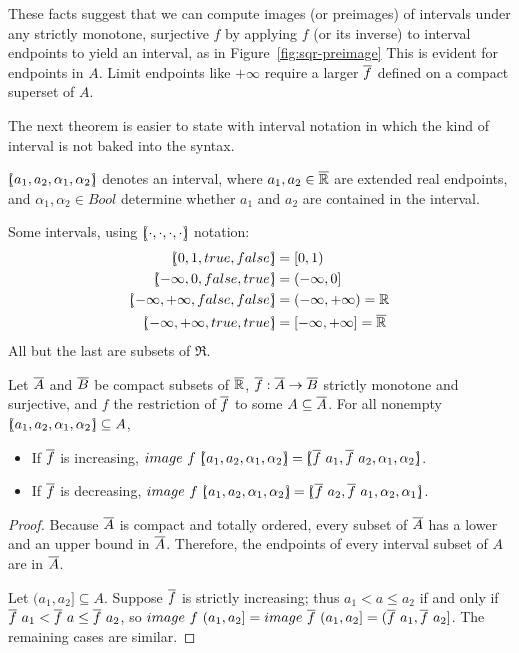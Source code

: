 These facts suggest that we can compute images (or preimages) of intervals under any strictly monotone, surjective $f$ by applying $f$ (or its inverse) to interval endpoints to yield an interval, as in Figure~\ref{fig:sqr-preimage}
This is evident for endpoints in $A$.
Limit endpoints like $+\infty$ require a larger $\cl{f}$ defined on a compact superset of $A$.

The next theorem is easier to state with interval notation in which the kind of interval is not baked into the syntax.

\begin{definition}[interval]
$[\mspace{-4.5mu}(a_1,a_2,\alpha_1,\alpha_2)\mspace{-4.5mu}]$ denotes an interval, where $a_1,a_2 \in \cl{\Re}$ are extended real endpoints, and $\alpha_1,\alpha_2 \in Bool$ determine whether $a_1$ and $a_2$ are contained in the interval.
\end{definition}

\begin{example}
Some intervals, using $[\mspace{-4.5mu}(\cdot,\cdot,\cdot,\cdot)\mspace{-4.5mu}]$ notation:
\begin{equation}
\begin{aligned}
	\ivl{0,1,true,false} &= [0,1) \\
	\ivl{-\infty,0,false,true} &= (-\infty,0] \\
	\ivl{-\infty,+\infty,false,false} &= (-\infty,+\infty) = \Re \\
	\ivl{-\infty,+\infty,true,true} &= [-\infty,+\infty] = \cl{\Re}
\end{aligned}
\end{equation}
All but the last are subsets of $\Re$.
\exampleqed
\end{example}

\begin{theorem}
\label{thm:images-of-intervals}
Let $\cl{A}$ and $\cl{B}$ be compact subsets of $\cl{\Re}$, $\cl{f} : \cl{A} \to \cl{B}$ strictly monotone and surjective, and $f$ the restriction of $\cl{f}$ to some $A \subseteq \cl{A}$.
For all nonempty $[\mspace{-4.5mu}(a_1,a_2,\alpha_1,\alpha_2)\mspace{-4.5mu}] \subseteq A$,
\begin{itemize}
	\item If $\cl{f}$ is increasing, $image~f~\ivl{a_1,a_2,\alpha_1,\alpha_2} = \ivl{\cl{f}~a_1, \cl{f}~a_2,\alpha_1,\alpha_2}$.
	\item If $\cl{f}$ is decreasing, $image~f~\ivl{a_1,a_2,\alpha_1,\alpha_2} = \ivl{\cl{f}~a_2, \cl{f}~a_1,\alpha_2,\alpha_1}$.
\end{itemize}
\end{theorem}
\begin{proof}
Because $\cl{A}$ is compact and totally ordered, every subset of $\cl{A}$ has a lower and an upper bound in $\cl{A}$.
Therefore, the endpoints of every interval subset of $A$ are in $\cl{A}$.

Let $(a_1,a_2] \subseteq A$.
Suppose $\cl{f}$ is strictly increasing; thus $a_1 < a \leq a_2$ if and only if $\cl{f}~a_1 < \cl{f}~a \leq \cl{f}~a_2$, so $image~f~(a_1,a_2] = image~\cl{f}~(a_1,a_2] = (\cl{f}~a_1,\cl{f}~a_2]$.
The remaining cases are similar.
\end{proof}

